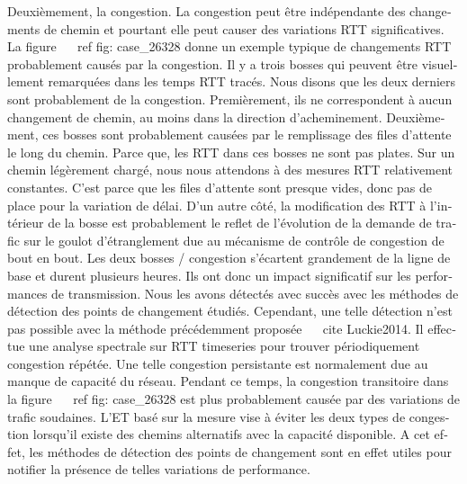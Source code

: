 \begin{otherlanguage}{french}
{{{Deuxièmement, la congestion.
La congestion peut être indépendante des changements de chemin et pourtant elle peut causer des variations RTT significatives.
La figure ~ \ ref {fig: case_26328} donne un exemple typique de changements RTT probablement causés par la congestion.
Il y a trois bosses qui peuvent être visuellement remarquées dans les temps RTT tracés.
Nous disons que les deux derniers sont probablement de la congestion.
Premièrement, ils ne correspondent à aucun changement de chemin, au moins dans la direction d'acheminement.
Deuxièmement, ces bosses sont probablement causées par le remplissage des files d'attente le long du chemin.
Parce que, les RTT dans ces bosses ne sont pas plates.
Sur un chemin légèrement chargé, nous nous attendons à des mesures RTT relativement constantes.
C'est parce que les files d'attente sont presque vides, donc pas de place pour la variation de délai.
D'un autre côté, la modification des RTT à l'intérieur de la bosse est probablement le reflet de l'évolution de la demande de trafic sur le goulot d'étranglement due au mécanisme de contrôle de congestion de bout en bout.
Les deux bosses / congestion s'écartent grandement de la ligne de base et durent plusieurs heures.
Ils ont donc un impact significatif sur les performances de transmission.
Nous les avons détectés avec succès avec les méthodes de détection des points de changement étudiés.
Cependant, une telle détection n'est pas possible avec la méthode précédemment proposée ~ \ cite {Luckie2014}.
Il effectue une analyse spectrale sur RTT timeseries pour trouver périodiquement congestion répétée.
Une telle congestion persistante est normalement due au manque de capacité du réseau.
Pendant ce temps, la congestion transitoire dans la figure ~ \ ref {fig: case_26328} est plus probablement causée par des variations de trafic soudaines.
L'ET basé sur la mesure vise à éviter les deux types de congestion lorsqu'il existe des chemins alternatifs avec la capacité disponible.
A cet effet, les méthodes de détection des points de changement sont en effet utiles pour notifier la présence de telles variations de performance.

}}}
\end{otherlanguage}
